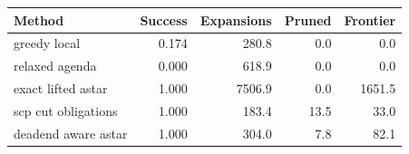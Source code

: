 \begin{tabular}{lrrrr}
\toprule
Method & Success & Expansions & Pruned & Frontier \\
\midrule
greedy local & 0.174 & 280.8 & 0.0 & 0.0 \\
relaxed agenda & 0.000 & 618.9 & 0.0 & 0.0 \\
exact lifted astar & 1.000 & 7506.9 & 0.0 & 1651.5 \\
scp cut obligations & 1.000 & 183.4 & 13.5 & 33.0 \\
deadend aware astar & 1.000 & 304.0 & 7.8 & 82.1 \\
\bottomrule
\end{tabular}
